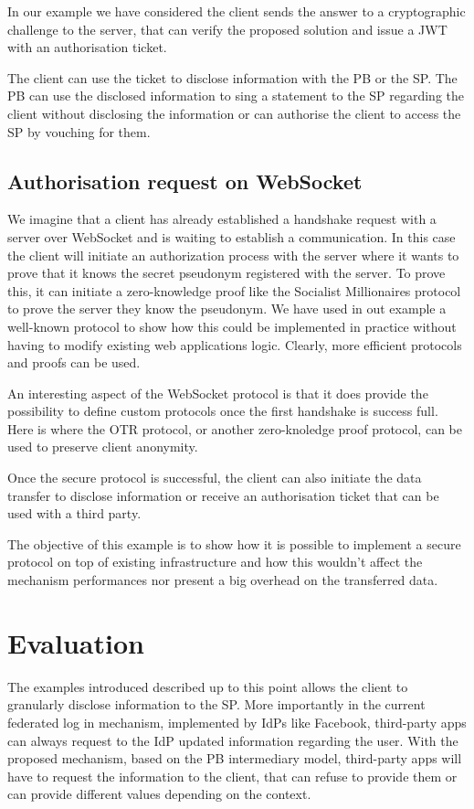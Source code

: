 In our example we have considered the client sends the answer to a cryptographic challenge to the server, that can verify the proposed solution and issue a JWT with an authorisation ticket. 

The client can use the ticket to disclose information with the PB or the SP. The PB can use the disclosed information to sing a statement to the SP regarding the client without disclosing the information or can authorise the client to access the SP by vouching for them.

\subsection{Authorisation request on WebSocket}

We imagine that a client has already established a handshake request with a server over WebSocket and is waiting to establish a communication. In this case the client will initiate an authorization process with the server where it wants to prove that it knows the secret pseudonym registered with the server. To prove this, it can initiate a zero-knowledge proof like the Socialist Millionaires protocol to prove the server they know the pseudonym. 
We have used in out example a well-known protocol to show how this could be implemented in practice without having to modify existing web applications logic. Clearly, more efficient protocols and proofs can be used.

An interesting aspect of the WebSocket protocol is that it does provide the possibility to define custom protocols once the first handshake is success full. Here is where the OTR protocol, or another zero-knoledge proof protocol, can be used to preserve client anonymity. 

Once the secure protocol is successful, the client can also initiate the data transfer to disclose information or receive an authorisation ticket that can be used with a third party.

The objective of this example is to show how it is possible to implement a secure protocol on top of existing infrastructure and how this wouldn't affect the mechanism performances nor present a big overhead on the transferred data.

\section{Evaluation}

The examples introduced described up to this point allows the client to granularly disclose information to the SP. More importantly in the current federated log in mechanism, implemented by IdPs like Facebook, third-party apps can always request to the IdP updated information regarding the user. With the proposed mechanism, based on the PB intermediary model, third-party apps will have to request the information to the client, that can refuse to provide them or can provide different values depending on the context. 

